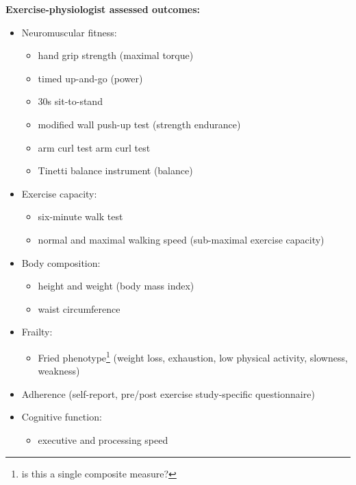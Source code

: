 \documentclass[
]{article}
\begin{document}
\textbf{Exercise-physiologist assessed outcomes:}
\begin{itemize}
  \item Neuromuscular fitness:
        \begin{itemize}
          \item hand grip strength (maximal torque)
          \item timed up-and-go (power)
          \item 30s sit-to-stand
          \item modified wall push-up test (strength endurance)
          \item arm curl test arm curl test
          \item Tinetti balance instrument (balance)
        \end{itemize}

  \item Exercise capacity:
        \begin{itemize}
          \item six-minute walk test
          \item normal and maximal walking speed (sub-maximal exercise capacity)
        \end{itemize}

  \item Body composition:
        \begin{itemize}
          \item height and weight (body mass index)
          \item waist circumference
        \end{itemize}

  \item Frailty:
        \begin{itemize}
          \item Fried phenotype\footnote{is this a single composite measure?} (weight loss, exhaustion, low physical activity, slowness, weakness)
        \end{itemize}

  \item Adherence (self-report, pre/post exercise study-specific questionnaire)

  \item Cognitive function:
        \begin{itemize}
          \item executive and processing speed
        \end{itemize}

\end{itemize}
\end{document}
